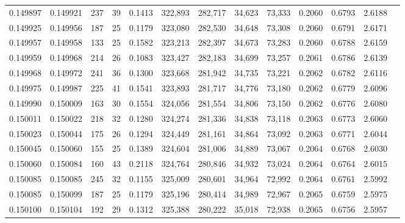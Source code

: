 \begin{tabular}{rrrrrrrrrrrrr}
0.149897 & 0.149921 &   237 &  39 &                                     0.1413 & 322,893 & 282,717 &  34,623 &  73,333 & 0.2060 & 0.6793 & 2.6188 \\
0.149925 & 0.149956 &   187 &  25 &                                     0.1179 & 323,080 & 282,530 &  34,648 &  73,308 & 0.2060 & 0.6791 & 2.6171 \\
0.149957 & 0.149958 &   133 &  25 &                                     0.1582 & 323,213 & 282,397 &  34,673 &  73,283 & 0.2060 & 0.6788 & 2.6159 \\
0.149959 & 0.149968 &   214 &  26 &                                     0.1083 & 323,427 & 282,183 &  34,699 &  73,257 & 0.2061 & 0.6786 & 2.6139 \\
0.149968 & 0.149972 &   241 &  36 &                                     0.1300 & 323,668 & 281,942 &  34,735 &  73,221 & 0.2062 & 0.6782 & 2.6116 \\
0.149975 & 0.149987 &   225 &  41 &                                     0.1541 & 323,893 & 281,717 &  34,776 &  73,180 & 0.2062 & 0.6779 & 2.6096 \\
0.149990 & 0.150009 &   163 &  30 &                                     0.1554 & 324,056 & 281,554 &  34,806 &  73,150 & 0.2062 & 0.6776 & 2.6080 \\
0.150011 & 0.150022 &   218 &  32 &                                     0.1280 & 324,274 & 281,336 &  34,838 &  73,118 & 0.2063 & 0.6773 & 2.6060 \\
0.150023 & 0.150044 &   175 &  26 &                                     0.1294 & 324,449 & 281,161 &  34,864 &  73,092 & 0.2063 & 0.6771 & 2.6044 \\
0.150045 & 0.150060 &   155 &  25 &                                     0.1389 & 324,604 & 281,006 &  34,889 &  73,067 & 0.2064 & 0.6768 & 2.6030 \\
0.150060 & 0.150084 &   160 &  43 &                                     0.2118 & 324,764 & 280,846 &  34,932 &  73,024 & 0.2064 & 0.6764 & 2.6015 \\
0.150085 & 0.150085 &   245 &  32 &                                     0.1155 & 325,009 & 280,601 &  34,964 &  72,992 & 0.2064 & 0.6761 & 2.5992 \\
0.150085 & 0.150099 &   187 &  25 &                                     0.1179 & 325,196 & 280,414 &  34,989 &  72,967 & 0.2065 & 0.6759 & 2.5975 \\
0.150100 & 0.150104 &   192 &  29 &                                     0.1312 & 325,388 & 280,222 &  35,018 &  72,938 & 0.2065 & 0.6756 & 2.5957 \\

\end{tabular}

